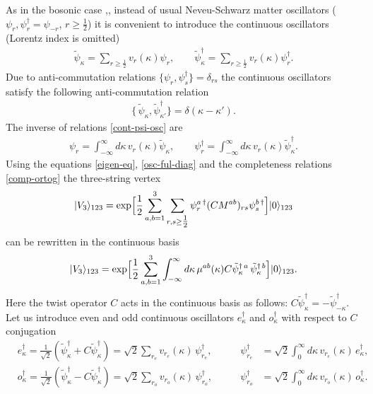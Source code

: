 \documentclass[a4paper,12pt]{article}
\begin{document}
As in the bosonic case \cite{0202087},\cite{0204164},
instead of usual Neveu-Schwarz matter oscillators
($\psi_{r},\psi^{\dag}_{r}=\psi_{-r}$, $r\geq\tfrac12$)
it is convenient to introduce the
continuous oscillators (Lorentz index is omitted)
\begin{gather}
\tilde{\psi}_\kappa
=\sum_{r\geq\tfrac12}v_{r}(\kappa)\psi_{r},\qquad
\tilde{\psi}_\kappa^{\dag}=\sum_{r\geq\tfrac12}v_{r}(\kappa)\psi_{r}^{\dag}.
\label{cont-psi-osc}
\end{gather}
Due to anti-commutation relations $\{\psi_{r},\psi^{\dag}_{s}\}=\delta_{rs}$
the continuous oscillators satisfy the following anti-commutation relation
\begin{gather}
\{\,\tilde{\psi}_\kappa,\tilde{\psi}_{\kappa'}^\dagger \}=\delta(\kappa - \kappa').
\label{anticommut-rel}
\end{gather}
The inverse of relations \eqref{cont-psi-osc} are
\begin{gather}
\psi_{r}
=\int_{-\infty}^{\infty}d\kappa\,v_{r}(\kappa)\tilde{\psi}_{\kappa},\qquad
\psi^{\dag}_{r}
=\int_{-\infty}^{\infty}d\kappa\,v_{r}(\kappa)\tilde{\psi}^{\dag}_{\kappa}.
\label{osc-ful-diag}
\end{gather}
Using the equations \eqref{eigen-eq}, \eqref{osc-ful-diag} and the completeness
relations \eqref{comp-ortog} the three-string vertex \cite{GJ3}
\begin{gather}
|V_3\rangle_{123}
=\exp\Bigl[\frac12\sum_{a,b=1}^{3}\sum_{r,s\geq\tfrac12}
\psi_{r}^{a\,\dagger}(CM^{ab})_{rs}
\psi_{s}^{b\,\dagger}\Bigr]|0\rangle_{123}
\label{vert-psi}
\end{gather}
can be rewritten in the continuous basis
\begin{gather}
|V_3\rangle_{123}=\exp\Bigl[\frac12\sum_{a,b=1}^{3}
\int_{-\infty}^{\infty}d\kappa\,
\mu^{ab}(\kappa)C\tilde{\psi}^{\dag\,a}_{\kappa}\,
\tilde{\psi}^{\dag\,b}_{\kappa}
\Bigr]|0\rangle_{123}.
\label{diag-psi}
\end{gather}
Here the twist operator $C$ acts in the continuous basis as follows:
$C\tilde{\psi}^{\dag}_{\kappa}=-\tilde{\psi}^{\dag}_{-\kappa}$.
Let us introduce even and odd  continuous
oscillators $e^{\dag}_\kappa$ and $o^{\dag}_\kappa$
with respect to $C$ conjugation
\begin{subequations}
\begin{align}
&e_\kappa^\dagger
=\frac{1}{\sqrt{2}}(\tilde{\psi}^{\dag}_{\kappa}+C\tilde{\psi}^{\dag}_{\kappa})
=\sqrt{2}\sum_{r_e}v_{r_e}(\kappa)\,\psi_{r_e}^\dagger,\qquad
&\psi_{r_e}^{\dagger}&
=\sqrt{2}\int_{0}^{\infty}d\kappa\,v_{r_e}(\kappa)\,e_{\kappa}^{\dagger},\\
&o_\kappa^\dagger
=\frac{1}{\sqrt{2}}(\tilde{\psi}^{\dag}_{\kappa}-C\tilde{\psi}^{\dag}_{\kappa})
=\sqrt{2}\sum_{r_o}v_{r_o}(\kappa)\,\psi_{r_o}^\dagger,\qquad
&\psi_{r_o}^{\dagger}&
=\sqrt{2}\int_{0}^{\infty}d\kappa\,v_{r_o}(\kappa)\,o_{\kappa}^{\dagger}.
\end{align}
\label{osc-def}
\end{subequations}
\end{document}
